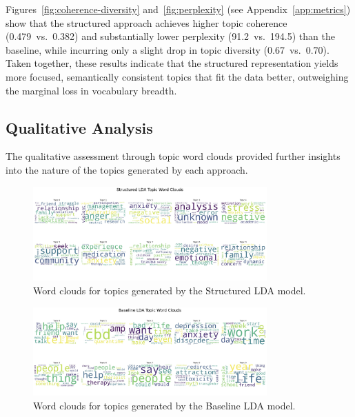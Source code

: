 \documentclass{article}
\begin{document}
\noindent
Figures~\ref{fig:coherence-diversity} and~\ref{fig:perplexity} (see Appendix~\ref{app:metrics}) show that the structured approach achieves higher topic coherence (0.479~vs.\ 0.382) and substantially lower perplexity (91.2~vs.\ 194.5) than the baseline, while incurring only a slight drop in topic diversity (0.67~vs.\ 0.70). Taken together, these results indicate that the structured representation yields more focused, semantically consistent topics that fit the data better, outweighing the marginal loss in vocabulary breadth.



\subsection{Qualitative Analysis}
The qualitative assessment through topic word clouds provided further insights into the nature of the topics generated by each approach.

\begin{figure}[ht]
    \centering
    \includegraphics[width=0.8\textwidth]{plots/structuredLDATopicWordClouds.jpeg}
    \caption{Word clouds for topics generated by the Structured LDA model.}
    \label{fig:wordcloud-structured}
\end{figure}

\begin{figure}[ht]
    \centering
    \includegraphics[width=0.8\textwidth]{plots/BaselineLDATopicWordClouds.jpeg}
    \caption{Word clouds for topics generated by the Baseline LDA model.}
    \label{fig:wordcloud-baseline}
\end{figure}
\end{document}
